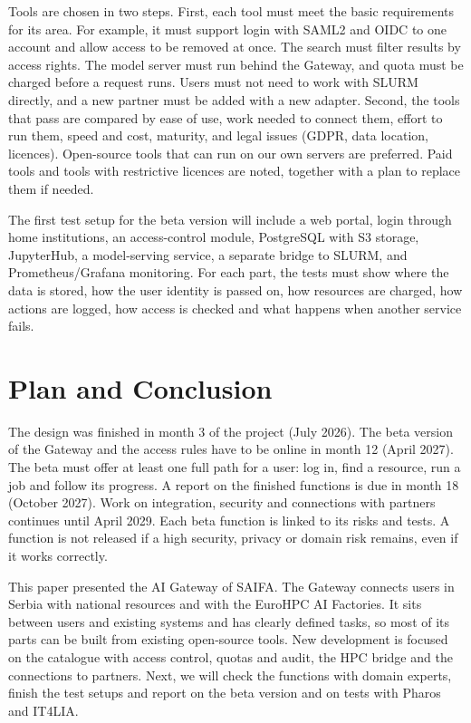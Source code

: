 \documentclass[conference,a4paper]{IEEEtran}
\begin{document}
Tools are chosen in two steps. First, each tool must meet the basic requirements for its area. For example, it must support login with SAML2 and OIDC to one account and allow access to be removed at once. The search must filter results by access rights. The model server must run behind the Gateway, and quota must be charged before a request runs. Users must not need to work with SLURM directly, and a new partner must be added with a new adapter. Second, the tools that pass are compared by ease of use, work needed to connect them, effort to run them, speed and cost, maturity, and legal issues (GDPR, data location, licences). Open-source tools that can run on our own servers are preferred. Paid tools and tools with restrictive licences are noted, together with a plan to replace them if needed.

The first test setup for the beta version will include a web portal, login through home institutions, an access-control module, PostgreSQL with S3 storage, JupyterHub, a model-serving service, a separate bridge to SLURM, and Prometheus/Grafana monitoring. For each part, the tests must show where the data is stored, how the user identity is passed on, how resources are charged, how actions are logged, how access is checked and what happens when another service fails.

\section{Plan and Conclusion}

The design was finished in month 3 of the project (July 2026). The beta version of the Gateway and the access rules have to be online in month 12 (April 2027). The beta must offer at least one full path for a user: log in, find a resource, run a job and follow its progress. A report on the finished functions is due in month 18 (October 2027). Work on integration, security and connections with partners continues until April 2029. Each beta function is linked to its risks and tests. A function is not released if a high security, privacy or domain risk remains, even if it works correctly.

This paper presented the AI Gateway of SAIFA. The Gateway connects users in Serbia with national resources and with the EuroHPC AI Factories. It sits between users and existing systems and has clearly defined tasks, so most of its parts can be built from existing open-source tools. New development is focused on the catalogue with access control, quotas and audit, the HPC bridge and the connections to partners. Next, we will check the functions with domain experts, finish the test setups and report on the beta version and on tests with Pharos and IT4LIA.



\end{document}

